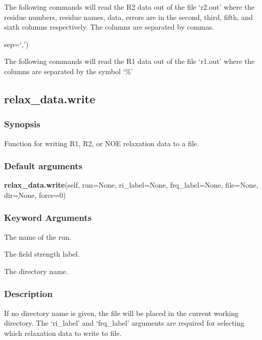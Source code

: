 The following commands will read the R2 data out of the file `r2.out' where the residue
numbers, residue names, data, errors are in the second, third, fifth, and sixth columns
respectively.  The columns are separated by commas.


                       sep=`,')


The following commands will read the R1 data out of the file `r1.out' where the columns are
separated by the symbol `\%'




\newpage

\subsection{relax\_data.write}


\subsubsection{Synopsis}

Function for writing R1, R2, or NOE relaxation data to a file.

\subsubsection{Default arguments}

\textsf{\textbf{relax\_data.write}(self, run=None, ri\_label=None, frq\_label=None, file=None, dir=None, force=0)}


\subsubsection{Keyword Arguments}

  The name of the run.

  The field strength label.

  The directory name.


\subsubsection{Description}

If no directory name is given, the file will be placed in the current working directory.
The `ri\_label' and `frq\_label' arguments are required for selecting which relaxation data
to write to file.


